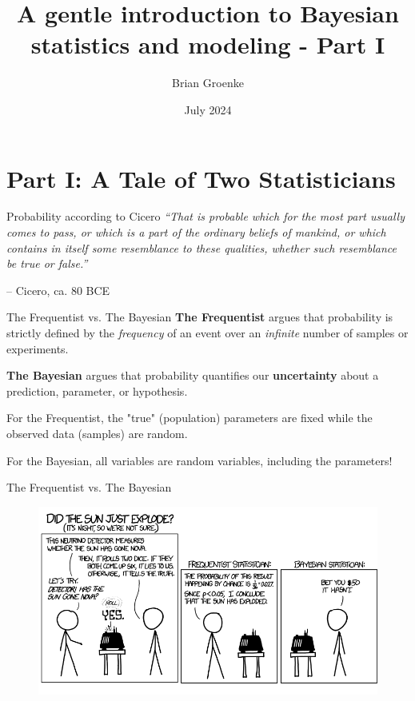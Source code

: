 \documentclass[12pt,aspectratio=169]{beamer}
\title{A gentle introduction to Bayesian statistics and modeling - Part I}
\author{Brian Groenke}
\date{July 2024}
\begin{document}
\maketitle
\addtocounter{framenumber}{-1}


\section{Part I: A Tale of Two Statisticians}

\begin{frame}{Probability according to Cicero}
    \centering
    \textit{``That is probable which for the most part usually comes to pass, or which is a part of the ordinary beliefs of mankind, or which contains in itself some resemblance to these qualities, whether such resemblance be true or false.''}
    
    -- Cicero, ca. 80 BCE
\end{frame}

\begin{frame}{The Frequentist vs. The Bayesian}
    \textbf{The Frequentist} argues that probability is strictly defined by the \textit{frequency} of an event over an \textit{infinite} number of samples or experiments.
    \pause\newline
    
    \textbf{The Bayesian} argues that probability quantifies our \textbf{uncertainty} about a prediction, parameter, or hypothesis.
    \pause\newline
    
    For the Frequentist, the "true" (population) parameters are fixed while the observed data (samples) are random.
    \pause\newline
    
    For the Bayesian, all variables are random variables, including the parameters!
\end{frame}  

\begin{frame}{The Frequentist vs. The Bayesian}
    \begin{figure}
        \centering
        \includegraphics[scale=0.44]{figs/frequentists_vs_bayesians_landscape.png}
    \end{figure}
\end{frame}
\end{document}
